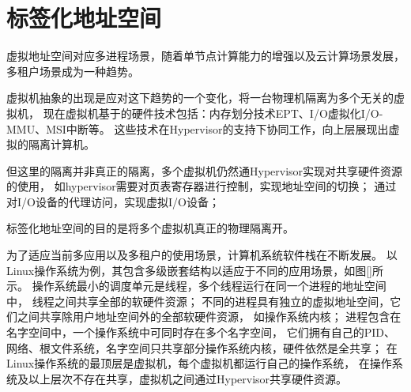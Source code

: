 

\chapter{标签化地址空间}
\label{chap:labeladdrspace}

虚拟地址空间对应多进程场景，随着单节点计算能力的增强以及云计算场景发展，
多租户场景成为一种趋势。

虚拟机抽象的出现是应对这下趋势的一个变化，将一台物理机隔离为多个无关的虚拟机，
现在虚拟机基于的硬件技术包括：内存划分技术EPT、I/O虚拟化I/O-MMU、MSI中断等。
这些技术在Hypervisor的支持下协同工作，向上层展现出虚拟的隔离计算机。

但这里的隔离并非真正的隔离，多个虚拟机仍然通Hypervisor实现对共享硬件资源的使用，
如hypervisor需要对页表寄存器进行控制，实现地址空间的切换；
通过对I/O设备的代理访问，实现虚拟I/O设备；

标签化地址空间的目的是将多个虚拟机真正的物理隔离开。


为了适应当前多应用以及多租户的使用场景，计算机系统软件栈在不断发展。
以Linux操作系统为例，其包含多级嵌套结构以适应于不同的应用场景，如图\ref{}所示。
操作系统最小的调度单元是线程，多个线程运行在同一个进程的地址空间中，
线程之间共享全部的软硬件资源；
不同的进程具有独立的虚拟地址空间，它们之间共享除用户地址空间外的全部软硬件资源，
如操作系统内核；
进程包含在名字空间中，一个操作系统中可同时存在多个名字空间，
它们拥有自己的PID、网络、根文件系统，名字空间只共享部分操作系统内核，硬件依然是全共享；
在Linux操作系统的最顶层是虚拟机，每个虚拟机都运行自己的操作系统，
在操作系统及以上层次不存在共享，虚拟机之间通过Hypervisor共享硬件资源。



